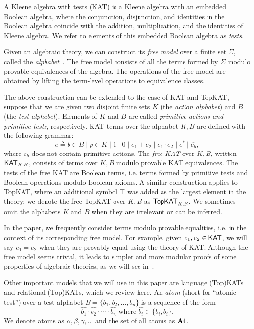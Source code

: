 A Kleene algebra with tests (KAT) is a Kleene algebra with an embedded Boolean algebra,
where the conjunction, disjunction, and identities in the Boolean algebra coincide with 
the addition, multiplication, and the identities of Kleene algebra.  
We refer to elements of this embedded Boolean algebra as \emph{tests}.

Given an algebraic theory, we can construct its \emph{free model} 
over a finite set \( \Sigma \), 
called the \emph{alphabet}~\cite{burrisCourseUniversalAlgebra1981}.  
The free model consists of all the terms formed by \( \Sigma \) modulo 
provable equivalences of the algebra. The operations of the free model are obtained 
by lifting the term-level operations to equivalence classes.

The above construction can be extended to the case of KAT and TopKAT, 
suppose that we are given two disjoint finite sets $K$ (the
\emph{action alphabet}) and $B$ (the \emph{test alphabet}).  Elements of $K$ and
$B$ are called \emph{primitive actions and primitive tests}, respectively. 
KAT terms over the alphabet \(K, B\) are defined with the following grammar:
\[e  ≜  b  ∈  B  ∣  p  ∈  K  ∣  1  ∣  0  ∣  e_1 + e_2  ∣  e_1  ⋅  e_2  ∣  e^*  ∣  \overline{e_b},\]
where \(e_b\) does not contain primitive actions.
The \emph{free KAT} over \(K, B\), written $\mathsf{KAT}_{K,B}$, 
consists of terms over \(K, B\) modulo provable KAT equivalences.  
The tests of the free KAT are Boolean terms, i.e. terms formed by
primitive tests and Boolean operations modulo Boolean axioms.  A similar
construction applies to TopKAT, where an additional symbol \( ⊤ \) was added 
as the largest element in the theory; we denote the free TopKAT over $K,B$ as
\(\mathsf{TopKAT}_{K, B}\).  We sometimes omit the alphabets \(K\) and \(B\) when they
are irrelevant or can be inferred.

In the paper, we frequently consider terms modulo provable equalities, i.e. in the
context of its corresponding free model.  For example, given \(e_1, e_2  \in  \mathsf{KAT}\),
we will say \(e_1 = e_2\) when they are provably equal using the theory of KAT.
Although the free model seems trivial, it leads to simpler and more modular
proofs of some properties of algebraic theories, as we will see in~.

Other important models that we will use in this paper are language (Top)KATs and
relational (Top)KATs, which we review here.  An \emph{atom} (short for ``atomic
test'') over a test alphabet \(B = \{b_{1}, b_{2},  \ldots , b_{n}\}\) is a sequence of the form
\[\hat{b_{1}}  \cdot  \hat{b_{2}}  \cdot   \cdots   \cdot \hat{b_{n}} \text{ where } \hat{b_{i}}  \in  \{b_{i}, \bar{b_{i}}\}.\] 
We denote atoms as \( \alpha ,  \beta ,  \gamma ,  \ldots \) and the set of all atoms as \(\mathbf{At}\).

